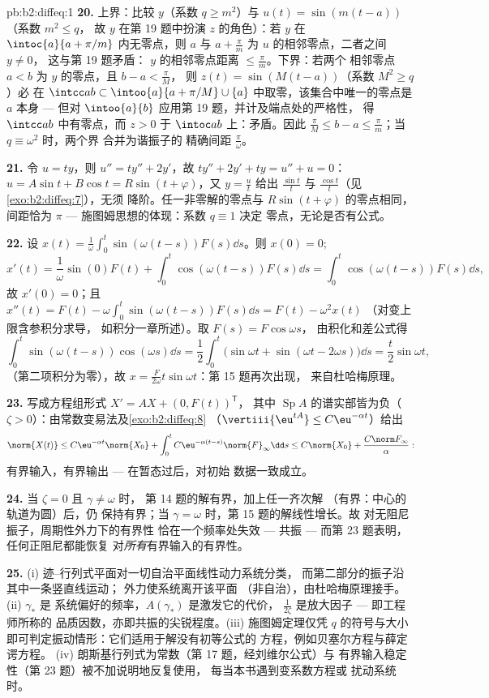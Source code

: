 \begin{solution}{pb:b2:diffeq:1}
\textbf{20.} 上界：比较 $y$（系数 $q \geq
m^2$）与 $u(t) = \sin(m(t - a))$（系数 $m^2 \leq q$，
故 $y$ 在第 19 题中扮演 $z$ 的角色）：若 $y$
在 $\intoc{a}{a + \pi/m}$ 内无零点，则 $a$ 与 $a +
\frac\pi m$ 为 $u$ 的相邻零点，二者之间 $y \neq 0$，
这与第 19 题矛盾：
$y$ 的相邻零点距离 $\leq \frac\pi m$。下界：若两个
相邻零点 $a < b$ 为 $y$ 的零点，且 $b - a < \frac\pi M$，
则 $z(t) = \sin(M(t-a))$（系数 $M^2 \geq q$）必
在 $\intcc ab \subset \intoo{a}{a + \pi/M}
\cup\{a\}$ 中取零，该集合中唯一的零点是 $a$ 本身 ---
但对 $\intoo{a}{b}$ 应用第 19 题，并计及端点处的严格性，
得 $\intcc ab$ 中有零点，而 $z > 0$ 于
$\intoc ab$ 上：矛盾。因此 $\frac\pi M \leq b - a \leq
\frac\pi m$；当 $q \equiv \omega^2$ 时，两个界
合并为谐振子的
精确间距 $\frac\pi\omega$。

\textbf{21.} 令 $u = ty$，则 $u'' = ty'' + 2y'$，故 $ty'' + 2y'
+ ty = u'' + u = 0$：$u = A\sin t + B\cos t = R\sin(t +
\varphi)$，又 $y = \frac{u}{t}$ 给出 $\frac{\sin t}t$ 与
$\frac{\cos t}t$（见\cref{exo:b2:diffeq:7}），无须
降阶。任一非零解的零点与
$R\sin(t + \varphi)$ 的零点相同，间距恰为 $\pi$ ---
施图姆思想的体现：系数 $q \equiv 1$ 决定
零点，无论是否有公式。

\textbf{22.} 设 $x(t) =
\frac1\omega\int_0^t\sin(\omega(t-s))F(s)\dd s$。则 $x(0) =
0$;
\[
x'(t) = \frac1\omega\sin(0)F(t) +
\int_0^t\cos(\omega(t-s))F(s)\dd s
= \int_0^t\cos(\omega(t-s))F(s)\dd s ,
\]
故 $x'(0) = 0$；且 $x''(t) = F(t) -
\omega\int_0^t\sin(\omega(t-s))F(s)\dd s = F(t) - \omega^2x(t)$
（对变上限含参积分求导，
如积分一章所述）。取 $F(s) = F\cos\omega s$，
由积化和差公式得
\[
\int_0^t\sin(\omega(t-s))\cos(\omega s)\dd s
= \frac12\int_0^t\bigl(\sin\omega t + \sin(\omega t -
2\omega s)\bigr)\dd s
= \frac{t}{2}\sin\omega t ,
\]
（第二项积分为零），故 $x =
\frac{F}{2\omega}t\sin\omega t$：第 15 题再次出现，
来自杜哈梅原理。

\textbf{23.} 写成方程组形式 $X' = AX + (0, F(t))^{\mathsf T}$，
其中 $\operatorname{Sp}A$ 的谱实部皆为负（$\zeta >
0$）：由常数变易法及\cref{exo:b2:diffeq:8}
（$\vertiii{\eu^{tA}} \leq C\eu^{-\alpha t}$）给出
\[
\norm{X(t)} \leq C\eu^{-\alpha t}\norm{X_0}
+ \int_0^t C\eu^{-\alpha(t-s)}\norm{F}_\infty\dd s
\leq C\norm{X_0} + \frac{C\norm F_\infty}{\alpha} :
\]
有界输入，有界输出 --- 在暂态过后，对初始
数据一致成立。

\textbf{24.} 当 $\zeta = 0$ 且 $\gamma \neq \omega$ 时，
第 14 题的解有界，加上任一齐次解
（有界：中心的轨道为圆）后，仍
保持有界；当 $\gamma = \omega$ 时，第 15 题的解线性增长。故
对无阻尼振子，周期性外力下的有界性
恰在一个频率处失效 --- 共振 ---
而第 23 题表明，任何正阻尼都能恢复
对\emph{所有}有界输入的有界性。

\textbf{25.} (i) 迹--行列式平面对一切自治平面线性动力系统分类，
而第二部分的振子沿其中一条竖直线运动；
外力使系统离开该平面
（非自治），由杜哈梅原理接手。(ii) $\gamma_*$ 是
系统偏好的频率，$A(\gamma_*)$ 是激发它的代价，
$\frac{1}{2\zeta}$ 是放大因子
--- 即工程师所称的
品质因数，亦即共振的尖锐程度。(iii) 施图姆定理仅凭 $q$ 的符号与大小
即可判定振动情形：它们适用于解没有初等公式的
方程，例如贝塞尔方程与薛定谔方程。
(iv) 朗斯基行列式为常数（第 17 题，经刘维尔公式）与
有界输入稳定性（第 23 题）被不加说明地反复使用，
每当本书遇到变系数方程或
扰动系统时。
\end{solution}
